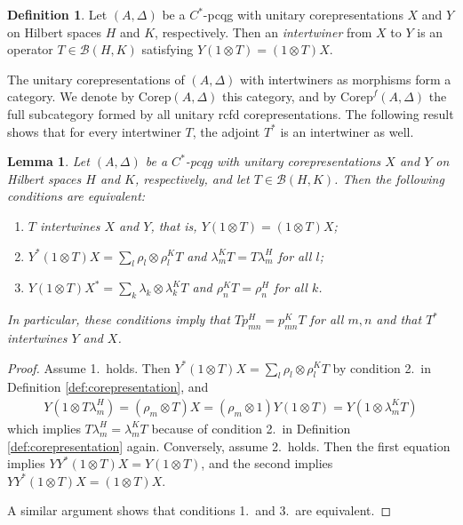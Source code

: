 \documentclass[11pt]{article}
\newcommand{\Corep}{\mathrm{Corep}}
\newcommand{\Corepf}{\mathrm{Corep}^{f}}
\newtheorem{Lem}[Theorem]{Lemma}
\theoremstyle{definition}
\newtheorem{Def}[Theorem]{Definition}
\numberwithin{equation}{section}
\begin{document}
\begin{Def} \label{def:intertwiner}
  Let $(A,\Delta)$ be a $C^{*}$-pcqg with unitary corepresentations $X$ and $Y$ on Hilbert spaces
  $H$ and $K$, respectively.  Then an \emph{intertwiner} from $X$ to $Y$ is an operator $T\in
  \mathcal{B}(H,K)$ satisfying   $Y(1\otimes T)=(1 \otimes T)X$.
\end{Def}
The unitary corepresentations of $(A,\Delta)$ with intertwiners as morphisms form a category.  We
denote by $\Corep(A,\Delta)$ this category, and by $\Corepf(A,\Delta)$ the full subcategory formed
by all unitary rcfd corepresentations. The following result shows that for every intertwiner $T$,
the adjoint $T^{*}$ is an intertwiner as well.
\begin{Lem} \label{lem:def-intertwiner}
  Let $(A,\Delta)$ be a $C^{*}$-pcqg with unitary corepresentations $X$ and $Y$ on Hilbert spaces
  $H$ and $K$, respectively, and let $T\in \mathcal{B}(H,K)$. Then the following conditions are
  equivalent:
  \begin{enumerate}
  \item $T$ intertwines $X$ and $Y$, that is, $Y(1\otimes T)=(1 \otimes T)X$;
  \item $Y^{*}(1\otimes T)X=\sum_{l} \rho_{l} \otimes \rho^{K}_{l}T$ and $\lambda_{m}^{K}T=T\lambda_{m}^{H}$ for all $l$;
  \item $Y(1\otimes T)X^{*} = \sum_{k} \lambda_{k} \otimes \lambda^{K}_{k}T$ and
    $\rho_{n}^{K}T=\rho_{n}^{H}$ for all $k$.
  \end{enumerate}
  In particular,  these conditions imply that $Tp_{mn}^{H}=p_{mn}^{K}T$ for all $m,n$ and that
  $T^{*}$ intertwines $Y$ and $X$.
\end{Lem}
\begin{proof}
  Assume 1.\ holds. Then $Y^{*}(1\otimes T)X=\sum_{l} \rho_{l} \otimes \rho^{K}_{l}T$ by condition
  2.\ in Definition \ref{def:corepresentation}, and
  \begin{align*}
    Y(1\otimes T\lambda^{H}_{m}) = (\rho_{m} \otimes T)X = (\rho_{m} \otimes 1)Y(1\otimes T) =
    Y(1\otimes \lambda^{K}_{m}T)
  \end{align*}
which implies $T\lambda^{H}_{m} = \lambda^{K}_{m}T$ because of  condition
  2.\ in Definition \ref{def:corepresentation} again. 
Conversely, assume 2.\ holds. Then the first equation implies $YY^{*}(1\otimes T)X = Y(1\otimes T)$,
and the second implies $YY^{*}(1\otimes T)X=(1\otimes T)X$.

 A similar argument shows that conditions 1.\ and 3.\ are equivalent.
\end{proof}
\end{document}

